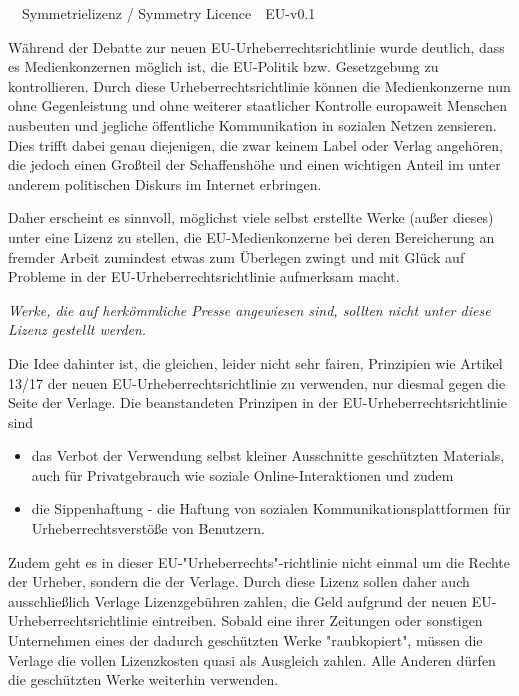 \documentclass[a4paper,8pt]{extarticle}
\author{}
\date{}
\begin{document}
 
\frenchspacing
\fontsize{8.1pt}{9pt}\selectfont

\begingroup
  \centering
  \LARGE {}\ \ Symmetrielizenz / Symmetry Licence\ \ EU-v0.1\\[3em]
\endgroup


Während der Debatte zur neuen EU-Urheberrechtsrichtlinie wurde deutlich, dass es Medienkonzernen möglich ist, die EU-Politik bzw. Gesetzgebung zu kontrollieren. Durch diese Urheberrechtsrichtlinie können die Medienkonzerne nun ohne Gegenleistung und ohne weiterer staatlicher Kontrolle europaweit Menschen ausbeuten und jegliche öffentliche Kommunikation in sozialen Netzen zensieren. Dies trifft dabei genau diejenigen, die zwar keinem Label oder Verlag angehören, die jedoch einen Großteil der Schaffenshöhe und einen wichtigen Anteil im unter anderem politischen Diskurs im Internet erbringen.

Daher erscheint es sinnvoll, möglichst viele selbst erstellte Werke (außer dieses) unter eine Lizenz zu stellen, die EU-Medienkonzerne bei deren Bereicherung an fremder Arbeit zumindest etwas zum Überlegen zwingt und mit Glück auf Probleme in der EU-Urheberrechtsrichtlinie aufmerksam macht.

\emph{Werke, die auf herkömmliche Presse angewiesen sind, sollten nicht unter diese Lizenz gestellt werden.}

Die Idee dahinter ist, die gleichen, leider nicht sehr fairen, Prinzipien wie Artikel 13/17 der neuen EU-Urheber\-rechts\-richt\-linie zu verwenden, nur diesmal gegen die Seite der Verlage. Die beanstandeten Prinzipen in der EU-Urheber\-rechts\-richt\-linie sind
\begin{itemize}
 \item das Verbot der Verwendung selbst kleiner Ausschnitte geschützten Materials, auch für Privatgebrauch wie soziale Online-Interaktionen und zudem
 \item die Sippenhaftung - die Haftung von sozialen Kommunikationsplattformen für Urheberrechtsverstöße von Benutzern.
\end{itemize}

Zudem geht es in dieser EU-"Urheber\-rechts"-richt\-linie nicht einmal um die Rechte der Urheber, sondern die der Verlage. Durch diese Lizenz sollen daher auch ausschließlich Verlage Lizenzgebühren zahlen, die Geld aufgrund der neuen EU-Urheber\-rechts\-richt\-linie eintreiben. Sobald eine ihrer Zeitungen oder sonstigen Unternehmen eines der dadurch geschützten Werke "raubkopiert", müssen die Verlage die vollen Lizenzkosten quasi als Ausgleich zahlen. Alle Anderen dürfen die geschützten Werke weiterhin verwenden.
\end{document}
